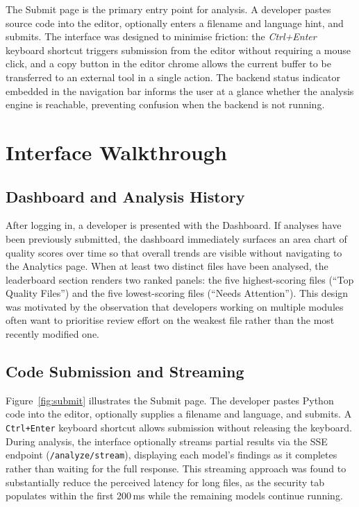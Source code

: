 \documentclass[12pt, oneside]{report}
\begin{document}
The Submit page is the primary entry point for analysis. A developer pastes source
code into the editor, optionally enters a filename and language hint, and submits.
The interface was designed to minimise friction: the \textit{Ctrl+Enter} keyboard
shortcut triggers submission from the editor without requiring a mouse click, and a
copy button in the editor chrome allows the current buffer to be transferred to an
external tool in a single action. The backend status indicator embedded in the
navigation bar informs the user at a glance whether the analysis engine is reachable,
preventing confusion when the backend is not running.

\section{Interface Walkthrough}
\label{sec:interface-walkthrough}

\subsection{Dashboard and Analysis History}

After logging in, a developer is presented with the Dashboard. If analyses have been
previously submitted, the dashboard immediately surfaces an area chart of quality scores
over time so that overall trends are visible without navigating to the Analytics page.
When at least two distinct files have been analysed, the leaderboard section renders
two ranked panels: the five highest-scoring files (``Top Quality Files'') and the five
lowest-scoring files (``Needs Attention''). This design was motivated by the observation
that developers working on multiple modules often want to prioritise review effort on
the weakest file rather than the most recently modified one.

\subsection{Code Submission and Streaming}

Figure~\ref{fig:submit} illustrates the Submit page. The developer pastes Python code
into the editor, optionally supplies a filename and language, and submits. A
\texttt{Ctrl+Enter} keyboard shortcut allows submission without releasing the keyboard.
During analysis, the interface optionally streams partial results via the SSE endpoint
(\texttt{/analyze/stream}), displaying each model's findings as it completes rather than
waiting for the full response. This streaming approach was found to substantially reduce
the perceived latency for long files, as the security tab populates within the first
200\,ms while the remaining models continue running.
\end{document}
